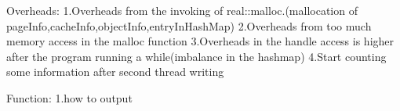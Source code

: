 Overheads:
    1.Overheads from the invoking of real::malloc.(mallocation of pageInfo,cacheInfo,objectInfo,entryInHashMap)
    2.Overheads from too much memory access in the malloc function
    3.Overheads in the handle access is higher after the program running a while(imbalance in the hashmap)
    4.Start counting some information after second thread writing

Function:
    1.how to output